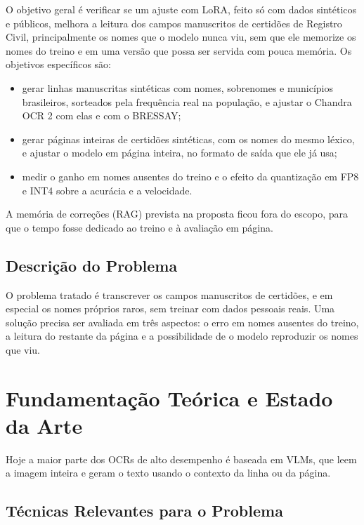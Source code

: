\documentclass[12pt,a4paper]{article}
\begin{document}
O objetivo geral é verificar se um ajuste com LoRA, feito só com dados sintéticos e públicos, melhora a leitura dos campos manuscritos de certidões de Registro Civil, principalmente os nomes que o modelo nunca viu, sem que ele memorize os nomes do treino e em uma versão que possa ser servida com pouca memória. Os objetivos específicos são:
\begin{itemize}
    \item gerar linhas manuscritas sintéticas com nomes, sobrenomes e municípios brasileiros, sorteados pela frequência real na população, e ajustar o Chandra OCR 2 com elas e com o BRESSAY;
    \item gerar páginas inteiras de certidões sintéticas, com os nomes do mesmo léxico, e ajustar o modelo em página inteira, no formato de saída que ele já usa;
    \item medir o ganho em nomes ausentes do treino e o efeito da quantização em FP8 e INT4 sobre a acurácia e a velocidade.
\end{itemize}
A memória de correções (RAG) prevista na proposta ficou fora do escopo, para que o tempo fosse dedicado ao treino e à avaliação em página.

\subsection{Descrição do Problema}

O problema tratado é transcrever os campos manuscritos de certidões, e em especial os nomes próprios raros, sem treinar com dados pessoais reais. Uma solução precisa ser avaliada em três aspectos: o erro em nomes ausentes do treino, a leitura do restante da página e a possibilidade de o modelo reproduzir os nomes que viu.

\section{Fundamentação Teórica e Estado da Arte}
\label{sec:fundamentacao}

Hoje a maior parte dos OCRs de alto desempenho é baseada em VLMs, que leem a imagem inteira e geram o texto usando o contexto da linha ou da página.

\subsection{Técnicas Relevantes para o Problema}
\end{document}
